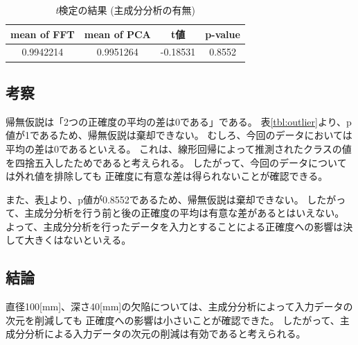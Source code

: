 \documentclass{jsarticle}
\begin{document}
\begin{table}
	\centering
	\caption{\emph{t}検定の結果 (主成分分析の有無)}
	\label{tbl:cmp}
	\begin{tabular}{c|c|c|c}
		\hline
		mean of FFT & mean of PCA & t値 & p-value \\ \hline \hline
		0.9942214 & 0.9951264 & -0.18531 & 0.8552 \\ \hline
	\end{tabular}
\end{table}

\subsection*{考察}
帰無仮説は「2つの正確度の平均の差は0である」である。
表\ref{tbl:outlier}より、p値が1であるため、帰無仮説は棄却できない。
むしろ、今回のデータにおいては平均の差は0であるといえる。
これは、線形回帰によって推測されたクラスの値を四捨五入したためであると考えられる。
したがって、今回のデータについては外れ値を排除しても
正確度に有意な差は得られないことが確認できる。

また、表\ref{tbl:cmp}より、p値が0.8552であるため、帰無仮説は棄却できない。
したがって、主成分分析を行う前と後の正確度の平均は有意な差があるとはいえない。
よって、主成分分析を行ったデータを入力とすることによる正確度への影響は決して大きくはないといえる。

\subsection*{結論}
直径100[mm]、深さ40[mm]の欠陥については、主成分分析によって入力データの次元を削減しても
正確度への影響は小さいことが確認できた。
したがって、主成分分析による入力データの次元の削減は有効であると考えられる。
\end{document}
